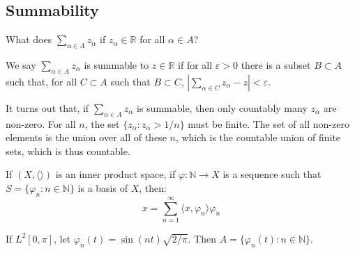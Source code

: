         \subsection{Summability}
            What does $\sum_{\alpha\in{A}}z_{\alpha}$
            if $z_{\alpha}\in\mathbb{R}$ for all
            $\alpha\in{A}$?
            \begin{definition}
                We say
                $\sum_{\alpha\in{A}}z_{\alpha}$ is summable
                to $z\in\mathbb{R}$ if for all
                $\varepsilon>0$ there is a subset
                $B\subset{A}$ such that, for all
                $C\subset{A}$ such that
                $B\subset{C}$,
                $|\sum_{\alpha\in{C}}z_{\alpha}-z|<\varepsilon$.
            \end{definition}
            It turns out that, if
            $\sum_{\alpha\in{A}}z_{\alpha}$ is summable, then
            only countably many $z_{\alpha}$ are non-zero.
            For all $n$, the set
            $\{z_{\alpha}:z_{\alpha}>1/n\}$ must be finite.
            The set of all non-zero elements is the
            union over all of these $n$, which is the
            countable union of finite sets, which is
            thus countable.
            \begin{theorem}
                If $(X,\langle\rangle)$ is an inner
                product space, if
                $\varphi:\mathbb{N}\rightarrow{X}$ is a
                sequence such that
                $S=\{\varphi_{n}:n\in\mathbb{N}\}$ is a
                basis of $X$, then:
                \begin{equation*}
                    x=\sum_{n=1}^{\infty}
                    \langle{x,\varphi_{n}}\rangle
                    \varphi_{n}
                \end{equation*}
            \end{theorem}
            \begin{example}
                If $L^{2}[0,\pi]$, let
                $\varphi_{n}(t)=\sin(nt)\sqrt{2/\pi}$. Then
                $A=\{\varphi_{n}(t):n\in\mathbb{N}\}$.
            \end{example}
